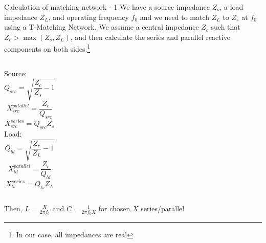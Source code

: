 \documentclass{beamer}
\begin{document}
\begin{frame}{Calculation of matching network - 1}
\small
We have a source impedance \(Z_s\), a load impedance \(Z_L\), and operating frequency \(f_0\) and we need to match \(Z_L\) to \(Z_s\) at \(f_0\) using a T-Matching Network. We assume a central impedance \(Z_c\) such that \(Z_c > \max(Z_s, Z_L)\), and then calculate the series and parallel reactive components on both sides.\footnote{In our case, all impedances are real}
\begin{columns}
  Source:
  \[Q_{src} = \sqrt{\frac{Z_c}{Z_s}-1}\]
  \[X_{src}^{patallel} = \frac{Z_c}{Q_{src}}\]
  \[X_{src}^{series} = Q_{src}Z_s\]
  Load:
  \[Q_{ld} = \sqrt{\frac{Z_c}{Z_L}-1}\]
  \[X_{ld}^{patallel} = \frac{Z_c}{Q_{ld}}\]
  \[X_{ls}^{series} = Q_{ls}Z_L\]
\end{columns}
Then, \(L=\frac{X}{2\pi f_0}\) and \(C = \frac{1}{2\pi f_0 X}\) for chosen \(X\) series/parallel
\end{frame}
\end{document}
